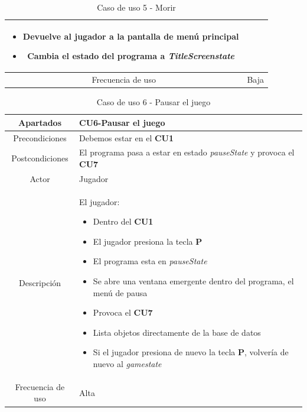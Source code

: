 \documentclass[a4paper]{article}
\begin{document}
\begin{table}[!ht]
\begin{tabular}{|c|p{12cm}|}
\begin{itemize}
            \item Devuelve al jugador a la pantalla de menú principal
            \item Cambia el estado del programa a \textit{TitleScreenstate}
        \end{itemize}                                                                           \\
        \hline
        Frecuencia de uso      & Baja                                                                                                            \\
        \hline
    \end{tabular}
    \caption{Caso de uso 5 - Morir}
    \label{tab:casosdeuso5-table}
\end{table}

\begin{table}[!ht]
    \centering
    \begin{tabular}{|c|p{12cm}|}
        \hline
        \textbf{Apartados} & \textbf{CU6-Pausar el juego}                                                     \\
        \hline
        Precondiciones     & Debemos estar en el \textbf{CU1}                                                 \\
        \hline
        Postcondiciones    & El programa pasa a estar en estado \textit{pauseState} y provoca el \textbf{CU7} \\
        \hline
        Actor              & Jugador                                                                          \\
        \hline
        Descripción        & El jugador:
        \begin{itemize}
            \item Dentro del \textbf{CU1}
            \item El jugador presiona la tecla \textbf{P}
            \item El programa esta en \textit{pauseState}
            \item[\faAngleRight] Se abre una ventana emergente dentro del programa, el menú de pausa
            \item[\faAngleRight] Provoca el \textbf{CU7}
            \item[\faAngleRight] Lista objetos directamente de la base de datos
            \item Si el jugador presiona de nuevo la tecla \textbf{P}, volvería de nuevo al \textit{gamestate}
        \end{itemize}     \\
        \hline
        Frecuencia de uso  & Alta                                                                             \\
        \hline
    \end{tabular}
    \caption{Caso de uso 6 - Pausar el juego}
    \label{tab:casosdeuso6-table}
\end{table}
\end{document}
